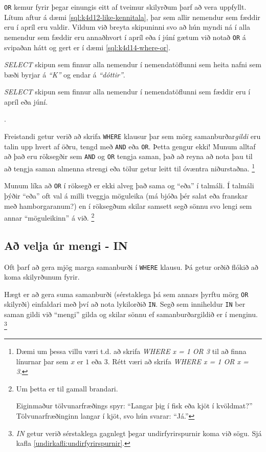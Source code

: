\verb|OR| kemur fyrir þegar einungis eitt af tveimur skilyrðum þarf að vera uppfyllt. Lítum aftur á dæmi \ref{sql:k4d12-like-kennitala}, þar sem allir nemendur sem fæddir eru í apríl eru valdir. Vildum við breyta skipuninni svo að hún myndi ná í alla nemendur sem fæddir eru annaðhvort í apríl eða í júní gætum við notað \verb|OR| á svipaðan hátt og gert er í dæmi \ref{sql:k4d14-where-or}.

\begin{example}
\caption[WHERE með AND]{\emph{SELECT} skipun sem finnur alla nemendur í nemendatöflunni sem heita nafni sem bæði byrjar á \emph{``K''} og endar á \emph{``dóttir''}.}
\label{sql:k4d13-where-and}
\centering
{}
\end{example}

\begin{example}
\caption[WHERE með OR]{\emph{SELECT} skipun sem finnur alla nemendur í nemendatöflunni sem fæddir eru í apríl eða júní.}
\label{sql:k4d14-where-or}.
\centering
{}
\end{example}

\newpage
Freistandi getur verið að skrifa \verb|WHERE| klausur þar sem mörg samanburðar\emph{gildi} eru talin upp hvert af öðru, tengd með \verb|AND| eða \verb|OR|. Þetta gengur ekki! Munum alltaf að það eru röksegðir sem \verb|AND| og \verb|OR| tengja saman, það að reyna að nota þau til að tengja saman almenna strengi eða tölur getur leitt til óvæntra niðurstaðna. \footnote{Dæmi um þessa villu væri t.d. að skrifa \emph{WHERE x = 1 OR 3} til að finna línurnar þar sem $x$ er $1$ eða $3$. Rétt væri að skrifa \emph{WHERE x = 1 OR x = 3}.}

Munum líka að \verb|OR| í röksegð er ekki alveg það sama og ``eða'' í talmáli. Í talmáli þýðir ``eða'' oft val á milli tveggja möguleika (má bjóða þér salat eða franskar með hamborgaranum?) en í röksegðum skilar samsett segð sönnu svo lengi sem annar ``möguleikinn'' á við. \footnote{Um þetta er til gamall brandari.

Eiginmaður tölvunarfræðings spyr: ``Langar þig í fisk eða kjöt í kvöldmat?'' Tölvunarfræðinginn langar í kjöt, svo hún svarar: ``Já.''}
\subsection{Að velja úr mengi - IN} %
Oft þarf að gera mjög marga samanburði í \verb|WHERE| klausu. Þá getur orðið flókið að koma skilyrðunum fyrir.

Hægt er að gera suma samanburði (sérstaklega þá sem annars þyrftu mörg \verb|OR| skilyrði) einfaldari með því að nota lykilorðið \verb|IN|. Segð sem inniheldur \verb|IN| ber saman gildi við ``mengi'' gilda og skilar sönnu ef samanburðargildið er í menginu. \footnote{\emph{IN} getur verið sérstaklega gagnlegt þegar undirfyrirspurnir koma við sögu. Sjá kafla \ref{undirkafli:undirfyrirspurnir}.}

